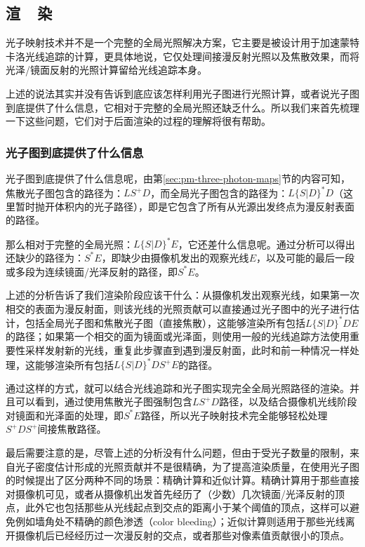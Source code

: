 \subsection{渲~~染}\label{sec:pm-rendering}
光子映射技术并不是一个完整的全局光照解决方案，它主要是被设计用于加速蒙特卡洛光线追踪的计算，更具体地说，它仅处理间接漫反射光照以及焦散效果，而将光泽/镜面反射的光照计算留给光线追踪本身。

上述的说法其实并没有告诉到底应该怎样利用光子图进行光照计算，或者说光子图到底提供了什么信息，它相对于完整的全局光照还缺乏什么。所以我们来首先梳理一下这些问题，它们对于后面渲染的过程的理解将很有帮助。




\subsubsection{光子图到底提供了什么信息}
光子图到底提供了什么信息呢，由第\ref{sec:pm-three-photon-maps}节的内容可知，焦散光子图包含的路径为：$LS^{+}D$，而全局光子图包含的路径为：$L\{S|D\}^{*}D$（这里暂时抛开体积内的光子路径），即是它包含了所有从光源出发终点为漫反射表面的路径。

那么相对于完整的全局光照：$L\{S|D\}^{*}E$，它还差什么信息呢。通过分析可以得出还缺少的路径为：$S^{*}E$，即缺少由摄像机发出的观察光线$E$，以及可能的最后一段或多段为连续镜面/光泽反射的路径，即$S^{*}E$。

上述的分析告诉了我们渲染阶段应该干什么：从摄像机发出观察光线，如果第一次相交的表面为漫反射面，则该光线的光照贡献可以直接通过光子图中的光子进行估计，包括全局光子图和焦散光子图（直接焦散），这能够渲染所有包括$L\{S|D\}^{*}DE$的路径；如果第一个相交的面为镜面或光泽面，则使用一般的光线追踪方法使用重要性采样发射新的光线，重复此步骤直到遇到漫反射面，此时和前一种情况一样处理，这能够渲染所有包括$L\{S|D\}^{*}DS^{+}E$的路径。

通过这样的方式，就可以结合光线追踪和光子图实现完全全局光照路径的渲染。并且可以看到，通过使用焦散光子图强制包含$LS^{+}D$路径，以及结合摄像机光线阶段对镜面和光泽面的处理，即$S^{*}E$路径，所以光子映射技术完全能够轻松处理$S^{+}DS^{+}$间接焦散路径。

最后需要注意的是，尽管上述的分析没有什么问题，但由于受光子数量的限制，来自光子密度估计形成的光照贡献并不是很精确，为了提高渲染质量，\cite{a:GlobalIlluminationusingPhotonMaps}在使用光子图的时候提出了区分两种不同的场景：精确计算和近似计算。精确计算用于那些直接对摄像机可见，或者从摄像机出发首先经历了（少数）几次镜面/光泽反射的顶点，此外它也包括那些从光线起点到交点的距离小于某个阈值的顶点，这样可以避免例如墙角处不精确的颜色渗透（color bleeding）；近似计算则适用于那些光线离开摄像机后已经经历过一次漫反射的交点，或者那些对像素值贡献很小的顶点。





